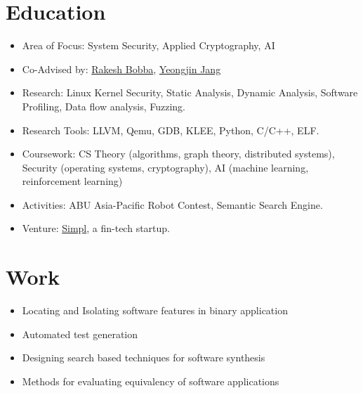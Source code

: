 \documentclass[11pt,a4paper,sans]{moderncv}
\begin{document}
\section{Education}
{
    \begin{itemize}
    \item Area of Focus: System Security, Applied Cryptography, AI
    \item Co-Advised by:
    \href{https://eecs.oregonstate.edu/people/bobba-rakesh}{Rakesh Bobba},
    \href{https://www.unexploitable.systems/}{Yeongjin Jang}
    \item Research: Linux Kernel Security, Static Analysis, Dynamic Analysis,
    Software Profiling, Data flow analysis, Fuzzing.
    \item Research Tools: LLVM, Qemu, GDB, KLEE, Python, C/C++, ELF.
    \item Coursework: CS Theory (algorithms, graph theory, distributed systems),
    Security (operating systems, cryptography), AI (machine learning,
    reinforcement learning)
    \end{itemize}
}
{
    \begin{itemize}
    \item Activities: ABU Asia-Pacific Robot Contest, Semantic Search Engine.
    \item Venture: \href{https://www.getsimpl.com}{Simpl}, a fin-tech startup.
    \end{itemize}
}

\section{Work}

{
    \begin{itemize}
    \item Locating and Isolating software features in binary application
    \item Automated test generation
    \item Designing search based techniques for software synthesis
    \item Methods for evaluating equivalency of software applications
    \end{itemize}
}
\end{document}
